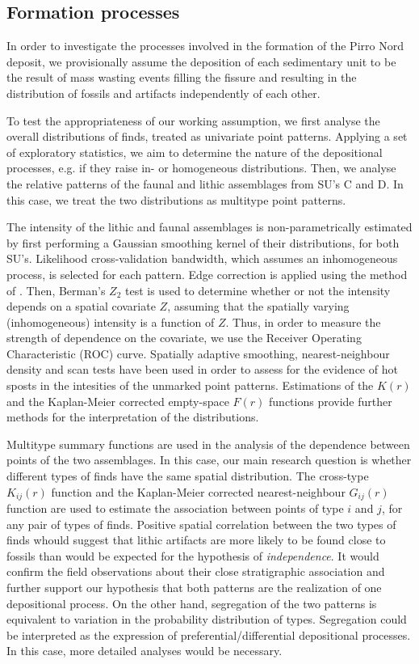 \documentclass[review,authoryear]{elsarticle} %
\begin{document}
\subsection{Formation processes}

In order to investigate the processes involved in the formation of the Pirro Nord deposit, we provisionally assume the deposition of each sedimentary unit to be the result of mass wasting events filling the fissure and resulting in the distribution of fossils and artifacts independently of each other.

To test the appropriateness of our working assumption, we first analyse the overall distributions of finds, treated as univariate point patterns. Applying a set of exploratory statistics, we aim to determine the nature of the depositional processes, e.g. if they raise in- or homogeneous distributions. Then, we analyse the relative patterns of the faunal and lithic assemblages from SU's C and D. In this case, we treat the two distributions as multitype point patterns.

The intensity of the lithic and faunal assemblages is non-parametrically estimated by first performing a Gaussian smoothing kernel of their distributions, for both SU's. Likelihood cross-validation bandwidth, which assumes an inhomogeneous process, is selected for each pattern. Edge correction is applied using the method of \cite{Diggle1985}. Then, Berman's $Z_2$ test is used to determine whether or not the intensity depends on a spatial covariate $Z$, assuming that the spatially varying (inhomogeneous) intensity is a function of $Z$. Thus, in order to measure the strength of dependence on the covariate, we use the Receiver Operating Characteristic (ROC) curve. Spatially adaptive smoothing, nearest-neighbour density and scan tests have been used in order to assess for the evidence of hot sposts in the intesities of the unmarked point patterns. Estimations of the $K(r)$ and the Kaplan-Meier corrected empty-space $F(r)$ functions provide further methods for the interpretation of the distributions.

Multitype summary functions are used in the analysis of the dependence between points of the two assemblages. In this case, our main research question is whether different types of finds have the same spatial distribution. The cross-type $K_{ij}(r)$ function and the Kaplan-Meier corrected nearest-neighbour $G_{ij}(r)$ function are used to estimate the association between points of type $i$ and $j$, for any pair of types of finds. Positive spatial correlation between the two types of finds whould suggest that lithic artifacts are more likely to be found close to fossils than would be expected for the hypothesis of \emph{independence}. It would confirm the field observations about their close stratigraphic association and further support our hypothesis that both patterns are the realization of one depositional process. On the other hand, segregation of the two patterns is equivalent to variation in the probability distribution of types. Segregation could be interpreted as the expression of preferential/differential depositional processes. In this case, more detailed analyses would be necessary.
\end{document}
